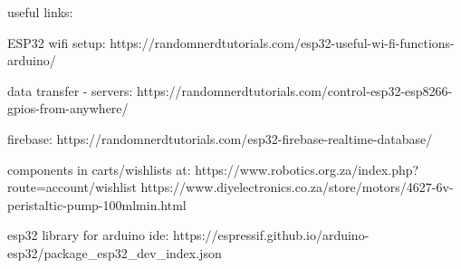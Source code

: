 useful links:

ESP32 wifi setup: https://randomnerdtutorials.com/esp32-useful-wi-fi-functions-arduino/

data transfer - servers: 
https://randomnerdtutorials.com/control-esp32-esp8266-gpios-from-anywhere/

firebase:
https://randomnerdtutorials.com/esp32-firebase-realtime-database/

components in carts/wishlists at: 
https://www.robotics.org.za/index.php?route=account/wishlist
https://www.diyelectronics.co.za/store/motors/4627-6v-peristaltic-pump-100mlmin.html

esp32 library for arduino ide:
https://espressif.github.io/arduino-esp32/package_esp32_dev_index.json